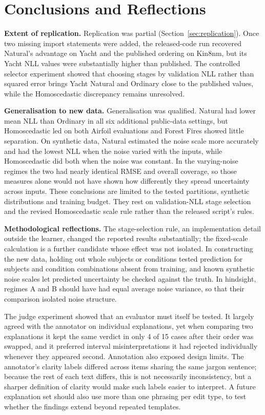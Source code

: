 \section{Conclusions and Reflections}
\label{sec:conclusions}

\textbf{Extent of replication.}
Replication was partial (Section~\ref{sec:replication}).
Once two missing import statements were added, the released-code run recovered Natural's advantage on Yacht and the published ordering on Kin8nm, but its Yacht NLL values were substantially higher than published.
The controlled selector experiment showed that choosing stages by validation NLL rather than squared error brings Yacht Natural and Ordinary close to the published values, while the Homoscedastic discrepancy remains unresolved.

\textbf{Generalisation to new data.}
Generalisation was qualified.
Natural had lower mean NLL than Ordinary in all six additional public-data settings, but Homoscedastic led on both Airfoil evaluations and Forest Fires showed little separation.
On synthetic data, Natural estimated the noise scale more accurately and had the lowest NLL when the noise varied with the inputs, while Homoscedastic did both when the noise was constant.
In the varying-noise regimes the two had nearly identical RMSE and overall coverage, so those measures alone would not have shown how differently they spread uncertainty across inputs.
These conclusions are limited to the tested partitions, synthetic distributions and training budget.
They rest on validation-NLL stage selection and the revised Homoscedastic scale rule rather than the released script's rules.

\textbf{Methodological reflections.}
The stage-selection rule, an implementation detail outside the learner, changed the reported results substantially; the fixed-scale calculation is a further candidate whose effect was not isolated.
In constructing the new data, holding out whole subjects or conditions tested prediction for subjects and condition combinations absent from training, and known synthetic noise scales let predicted uncertainty be checked against the truth.
In hindsight, regimes A and B should have had equal average noise variance, so that their comparison isolated noise structure.

The judge experiment showed that an evaluator must itself be tested.
It largely agreed with the annotator on individual explanations, yet when comparing two explanations it kept the same verdict in only 4 of 15 cases after their order was swapped, and it preferred interval misinterpretations it had rejected individually whenever they appeared second.
Annotation also exposed design limits.
The annotator's clarity labels differed across items sharing the same jargon sentence; because the rest of each text differs, this is not necessarily inconsistency, but a sharper definition of clarity would make such labels easier to interpret.
A future explanation set should also use more than one phrasing per edit type, to test whether the findings extend beyond repeated templates.


